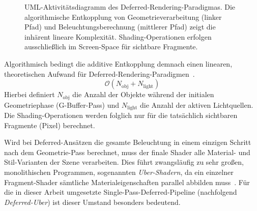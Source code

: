\begin{figure}[htbp]
{
    }
    \caption[UML-Aktivitätsdiagramm des Deferred-Rendering-Paradigmas]{UML-Aktivitätsdiagramm des
    Deferred-Rendering-Paradigmas.
    Die algorithmische Entkopplung von Geometrieverarbeitung (linker Pfad) und Beleuchtungsberechnung
        (mittlerer Pfad) zeigt die inhärent lineare Komplexität.
        Shading-Operationen erfolgen ausschließlich im Screen-Space für sichtbare Fragmente.}
    \label{fig:deferred_rendering_flow}
\end{figure}

Algorithmisch bedingt die additive Entkopplung demnach einen linearen, theoretischen Aufwand für
Deferred-Rendering-Paradigmen~\parencite[vgl.][Abschn.~3]{fonsecaDeferredShadingTutorial}.
\begin{equation}
    \mathcal{O}(N_{\text{obj}} + N_{\text{light}})
    \label{eq:deferred_shading_complexity}
\end{equation}
Hierbei definiert $N_{\text{obj}}$ die Anzahl der Objekte während der initialen Geometriephase (\ac{G-Buffer}-Pass)
und $N_{\text{light}}$ die Anzahl der aktiven Lichtquellen.
Die Shading-Operationen werden folglich nur für die tatsächlich sichtbaren Fragmente (Pixel) berechnet.

Wird bei Deferred-Ansätzen die gesamte Beleuchtung in einem einzigen Schritt nach dem Geometrie-Pass
berechnet, muss der finale Shader alle Material- und Stil-Varianten der Szene verarbeiten.
Dies führt zwangsläufig zu sehr großen, monolithischen Programmen, sogenannten \textit{Uber-Shadern},
da ein einzelner Fragment-Shader sämtliche Materialeigenschaften parallel abbilden
muss~\parencites(vgl.)()[S.~881]{akenine-mollerRealtimeRendering2019}[Abschn.~2.6]{Thaler2011DeferredRendering}
[Abschn.~6]{schiedDeferredAttributeInterpolation2015}.
Für die in dieser Arbeit umgesetzte Single-Pass-Deferred-Pipeline (nachfolgend \textit{Deferred-Uber}) ist dieser
Umstand besonders bedeutend.

